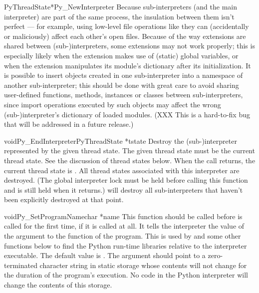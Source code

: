 \begin{cfuncdesc}{PyThreadState*}{Py_NewInterpreter}{}
   Because sub-interpreters (and the main
  interpreter) are part of the same process, the insulation between
  them isn't perfect --- for example, using low-level file operations
  like 
   they can (accidentally or maliciously) affect
  each other's open files.  Because of the way extensions are shared
  between (sub-)interpreters, some extensions may not work properly;
  this is especially likely when the extension makes use of (static)
  global variables, or when the extension manipulates its module's
  dictionary after its initialization.  It is possible to insert
  objects created in one sub-interpreter into a namespace of another
  sub-interpreter; this should be done with great care to avoid
  sharing user-defined functions, methods, instances or classes
  between sub-interpreters, since import operations executed by such
  objects may affect the wrong (sub-)interpreter's dictionary of
  loaded modules.  (XXX This is a hard-to-fix bug that will be
  addressed in a future release.)
\end{cfuncdesc}

\begin{cfuncdesc}{void}{Py_EndInterpreter}{PyThreadState *tstate}
  Destroy the (sub-)interpreter represented by the given thread state.
  The given thread state must be the current thread state.  See the
  discussion of thread states below.  When the call returns, the
  current thread state is \NULL.  All thread states associated with
  this interpreter are destroyed.  (The global interpreter lock must
  be held before calling this function and is still held when it
  returns.)   will
  destroy all sub-interpreters that haven't been explicitly destroyed
  at that point.
\end{cfuncdesc}

\begin{cfuncdesc}{void}{Py_SetProgramName}{char *name}
  This function should be called before
   is called
  for the first time, if it is called at all.  It tells the
  interpreter the value of the  argument to the
   function of the program.  This is
  used by  and some
  other functions below to find the Python run-time libraries relative
  to the interpreter executable.  The default value is
  .  The argument should point to a zero-terminated
  character string in static storage whose contents will not change
  for the duration of the program's execution.  No code in the Python
  interpreter will change the contents of this storage.
\end{cfuncdesc}

